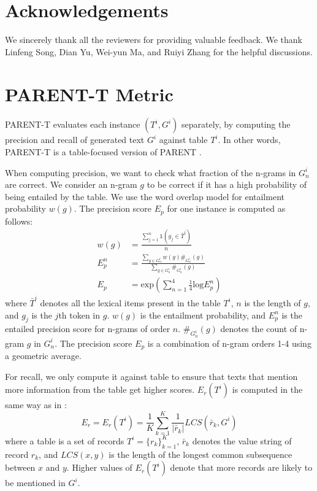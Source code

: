 \documentclass[11pt,a4paper]{article}
\begin{document}
\section*{Acknowledgements}

We sincerely thank all the reviewers for providing valuable feedback. We thank Linfeng Song, Dian Yu,  Wei-yun Ma, and Ruiyi Zhang for the helpful discussions. 

\nocite{song2018graph}



\newpage\clearpage\newpage
\appendix
\section{PARENT-T Metric} \label{app:parent-t}
PARENT-T evaluates each instance $(T^i, G^i)$ separately, by computing the precision and recall of generated text $G^i$ against table $T^i$. In other words, PARENT-T is a table-focused version of PARENT \cite{Dhingra2019}.

When computing precision, we want to check what fraction of the n-grams in $G_n^i$ are correct. We consider an n-gram $g$ to be correct if it has a high probability of being entailed by the table.
We use the word overlap model for entailment probability $w(g)$.
The precision score $E_p$ for one instance is computed as follows:
\begin{align}
    w(g) &= \frac{\sum_{j=1}^n \mathbb{1}(g_j\in \bar{T}^i)}{n} \\
    E_p^n &= \frac{\sum_{g\in G_n^i}w(g) \#_{G_n^i}(g)}{\sum_{g\in G_n^i}\#_{G_n^i}(g)} \\
    E_p &= \text{exp}\left(\sum_{n=1}^4 \frac{1}{4}\text{log}E_p^n\right)
\end{align}
where $\bar{T}^i$ denotes all the lexical items present in the table $T^i$, $n$ is the length of $g$, and $g_j$ is the $j$th token in $g$. $w(g)$ is the entailment probability, and $E_p^n$ is the entailed precision score for n-grams of order $n$. $\#_{G_n^i}(g)$ denotes the count of n-gram $g$ in $G_n^i$. The precision score $E_p$ is a combination of n-gram orders 1-4 using a geometric average.

For recall, we only compute it against table to ensure that texts that mention more information from the table get higher scores. 
$E_r(T^i)$ is computed in the same way as in \citet{Dhingra2019}:
\begin{equation}
    E_r = E_r(T^i) = \frac{1}{K}\sum_{k=1}^K\frac{1}{|\bar{r}_k|}LCS(\bar{r}_k, G^i)
\end{equation}
where a table is a set of records $T^i = \{r_k\}_{k=1}^K$, $\bar{r}_k$ denotes the value string of record $r_k$, and $LCS(x,y)$ is the length of the longest common subsequence between $x$ and $y$. Higher values of $E_r(T^i)$ denote that more records are likely to be mentioned in $G^i$.
\end{document}
